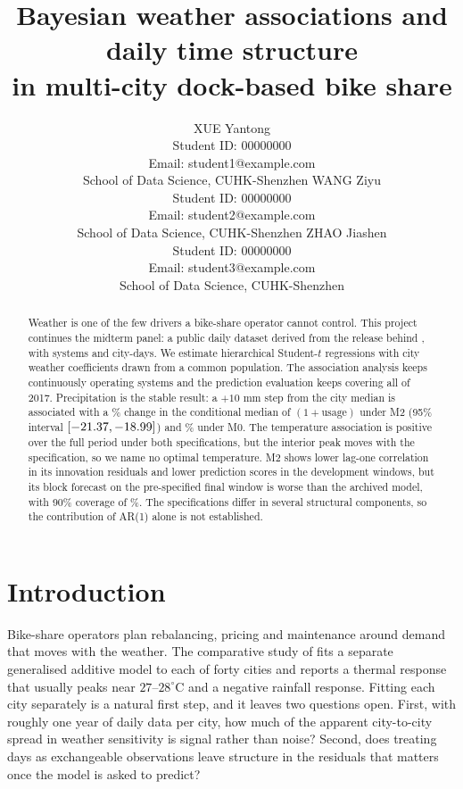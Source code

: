 \documentclass{article}
\title{Bayesian weather associations and daily time structure\\in multi-city dock-based bike share}
\author{%
  XUE Yantong \\
  Student ID: 00000000 \\
  Email: student1@example.com \\
  School of Data Science, CUHK-Shenzhen
  \And
  WANG Ziyu \\
  Student ID: 00000000 \\
  Email: student2@example.com \\
  School of Data Science, CUHK-Shenzhen
  \And
  ZHAO Jiashen \\
  Student ID: 00000000 \\
  Email: student3@example.com \\
  School of Data Science, CUHK-Shenzhen
}
\begin{document}
\maketitle

\begin{abstract}
Weather is one of the few drivers a bike-share operator cannot control. This project continues the
midterm panel: a public daily dataset derived from the release behind \citet{bean2021weather}, with
\PanelCityCount{} systems and \PanelRows{} city-days. We estimate hierarchical Student-$t$
regressions with city weather coefficients drawn from a common population. The association analysis
keeps \CityCount{} continuously operating systems and the prediction evaluation keeps
\PredCityCount{} covering all of 2017. Precipitation is the stable result: a $+10$ mm step from the
city median is associated with a \RainMTwoMed\% change in the conditional median of
$(1+\text{usage})$ under M2 (95\% interval $[-21.37,-18.99]$) and \RainMZeroMed\% under M0. The temperature association is positive over the full period under both
specifications, but the interior peak moves with the specification, so we name no optimal
temperature. M2 shows lower lag-one correlation in its innovation residuals and lower prediction
scores in the development windows, but its block forecast on the pre-specified final window is worse
than the archived model, with 90\% coverage of \MTwoFinalBlockCov\%. The specifications differ in
several structural components, so the contribution of AR(1) alone is not established.
\end{abstract}

\section{Introduction}

Bike-share operators plan rebalancing, pricing and maintenance around demand that moves with the
weather. The comparative study of \citet{bean2021weather} fits a separate generalised additive model
to each of forty cities and reports a thermal response that usually peaks near $27$--$28^\circ$C and
a negative rainfall response. Fitting each city separately is a natural first step, and it leaves
two questions open. First, with roughly one year of daily data per city, how much of the apparent
city-to-city spread in weather sensitivity is signal rather than noise? Second, does treating days
as exchangeable observations leave structure in the residuals that matters once the model is asked
to predict?
\end{document}
